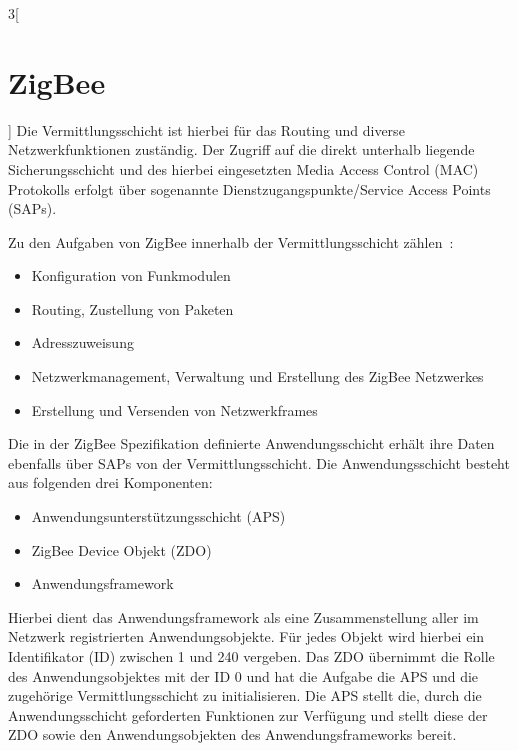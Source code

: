 \begin{multicols}{3}[\section{ZigBee}]
Die Vermittlungsschicht ist hierbei für das Routing und diverse Netzwerkfunktionen zuständig. Der Zugriff auf die direkt unterhalb liegende Sicherungsschicht und des hierbei eingesetzten Media Access Control (MAC) Protokolls erfolgt über sogenannte Dienstzugangspunkte/Service Access Points (SAPs).
\par Zu den Aufgaben von ZigBee innerhalb der Vermittlungsschicht zählen~\cite{zigbee.1}: 
\begin{itemize}
	\item Konfiguration von Funkmodulen
	\item Routing, Zustellung von Paketen
	\item Adresszuweisung
	\item Netzwerkmanagement, Verwaltung und Erstellung des ZigBee Netzwerkes
	\item Erstellung und Versenden von Netzwerkframes
\end{itemize}
Die in der ZigBee Spezifikation definierte Anwendungsschicht erhält ihre Daten ebenfalls über SAPs von der Vermittlungsschicht. Die Anwendungsschicht besteht aus folgenden drei Komponenten: 
\begin{itemize}
	\item Anwendungsunterstützungsschicht (APS)
	\item ZigBee Device Objekt (ZDO)
	\item Anwendungsframework
\end{itemize}
Hierbei dient das Anwendungsframework als eine Zusammenstellung aller im Netzwerk registrierten Anwendungsobjekte. Für jedes Objekt wird hierbei ein Identifikator (ID) zwischen 1 und 240 vergeben. Das ZDO übernimmt die Rolle des Anwendungsobjektes mit der ID 0 und hat die Aufgabe die APS und die zugehörige Vermittlungsschicht zu initialisieren. Die APS stellt die, durch die Anwendungsschicht geforderten Funktionen zur Verfügung und stellt diese der ZDO sowie den Anwendungsobjekten des Anwendungsframeworks bereit.~\cite{zigbee.1}

\end{multicols}

